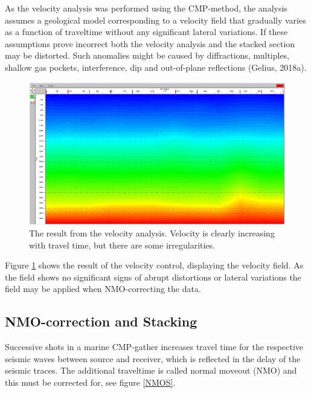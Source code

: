 \documentclass[10pt,a4paper]{article}
\begin{document}
As the velocity analysis was performed using the CMP-method, the analysis assumes a geological model corresponding to a velocity field that gradually varies as a function of traveltime without any significant lateral variations. If these assumptions prove incorrect both the velocity analysis and the stacked section may be distorted. Such anomalies might be caused by diffractions, multiples, shallow gas pockets, interference, dip and out-of-plane reflections (Gelius, 2018a). 

\begin{figure}[H]
\includegraphics[width=\textwidth]{Velo_anal_smooth.jpg}
\caption{The result from the velocity analysis. Velocity is clearly increasing with travel time, but there are some irregularities.}
\label{Smooth}
\end{figure}

\noindent Figure \ref{Smooth} shows the result of the velocity control, displaying the velocity field. As the field shows no significant signs of abrupt distortions or lateral variations the field may be applied when NMO-correcting the data.


\subsection{NMO-correction and Stacking}

Successive shots in a marine CMP-gather increases travel time for the respective seismic waves between source and receiver, which is reflected in the delay of the seismic traces. The additional traveltime is called normal moveout (NMO) and this must be corrected for, see figure \ref{NMOS}.
\end{document}
